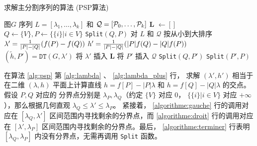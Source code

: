 \begin{algorithm}
  \caption{求解主分割序列的算法 (PSP算法)}
  \label{alg:psp}
  \small
  \begin{algorithmic}[1]
    \REQUIRE 图$G$
    \ENSURE 序列 $L=[\lambda_1, \dots, \lambda_k]$
    和 $\mathcal{Q}=[\P_0, \dots, \P_k]$
    \STATE \textbf{L}  $\leftarrow []$
    \STATE $Q\leftarrow \{V\}, P \leftarrow \{ \{i \} | i \in V\}$
    \STATE \texttt{Split}$(Q,P)$
    \STATE 对 $L$ 和 $\mathcal{Q}$
    按从小到大排序 \footnotemark
     \STATE\label{alg:lambda} $\lambda' =
     {1 \over \abs{P} - \abs{Q}} (f(P)-f(Q))$
     \STATE\label{alg:lambda_plus} $h' = {1 \over \abs{P} - \abs{Q}}(\abs{P} f(Q) - \abs{Q} f(P))$
     \STATE\label{alg:lambda_f} $(\tilde{h}, P') = \texttt{DT}(G,\lambda')$
       \STATE\label{algorithme:terminer} 将 $\lambda'$ 插入 $\mathbf{L}$
     \ELSE
       \STATE 将 $P'$ 插入 $\mathcal{Q}$
       \STATE\label{algorithme:gauche} \texttt{Split}$(Q, P')$
       \STATE\label{algorithme:droit} \texttt{Split}$(P',P)$
     \ENDIF
    \ENDFUNCTION
  \end{algorithmic}
\end{algorithm}

在算法 \ref{alg:psp} 第 \ref{alg:lambda} 、 \ref{alg:lambda_plus} 行，
求解 $(\lambda', h')$ 相当于在二维 $(\lambda, h)$
平面上计算直线
$h = f[P] - |P| \lambda $
和 $h = f[Q] - |Q| \lambda $ 的交点。假设 $P, Q$ 对应的
分界点分别是 $\lambda_P, \lambda_Q$（约定 $\{V\}$ 对应 0，
$\{\{i\}|i\in V\}$ 对应 $+\infty$），那么根据几何直观
$\lambda_Q \leq \lambda' \leq \lambda_P$。
紧接着， \ref{algorithme:gauche} 行的调用对应在
$[\lambda_Q, \lambda']$
区间范围内寻找剩余的分界点，而
 \ref{algorithme:droit} 行的调用对应在
$[\lambda', \lambda_P]$
区间范围内寻找剩余的分界点。最后，
 \ref{algorithme:terminer} 行表明
$[\lambda_Q, \lambda_P]$ 内没有分界点，无需再调用
\texttt{Split} 函数。

